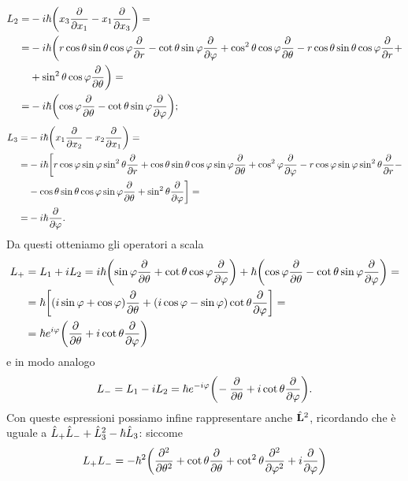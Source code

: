 \begin{equation}
	\begin{split}
		L_2=&-i\hbar\bigg(x_3\frac{\partial {}}{\partial {x_1}}-x_1\frac{\partial {}}{\partial {x_3}}\bigg)=\\
		=&-i\hbar\bigg(r\cos\theta\sin\theta\cos\varphi\frac{\partial {}}{\partial {r}}-\cot\theta\sin\varphi\frac{\partial {}}{\partial {\varphi}}+\cos^2\theta\cos\varphi\frac{\partial {}}{\partial {\theta}}-r\cos\theta\sin\theta\cos\varphi\frac{\partial {}}{\partial {r}}+\\
			&+\sin^2\theta\cos\varphi\frac{\partial {}}{\partial {\theta}}\bigg)=\\
		=&-i\hbar\bigg(\!\cos\varphi\frac{\partial {}}{\partial {\theta}}-\cot\theta\sin\varphi\frac{\partial {}}{\partial {\varphi}}\bigg);
	\end{split}
	\label{eq:L_2-schroedinger}
\end{equation}
\begin{equation}
	\begin{split}
		L_3=&-i\hbar\bigg(x_1\frac{\partial {}}{\partial {x_2}}-x_2\frac{\partial {}}{\partial {x_1}}\bigg)=\\
		=&-i\hbar\bigg[r\cos\varphi\sin\varphi\sin^2\theta\frac{\partial {}}{\partial {r}}+\cos\theta\sin\theta\cos\varphi\sin\varphi\frac{\partial {}}{\partial {\theta}}+\cos^2\varphi\frac{\partial {}}{\partial {\varphi}}-r\cos\varphi\sin\varphi\sin^2\theta\frac{\partial {}}{\partial {r}}-\\
			&-\cos\theta\sin\theta\cos\varphi\sin\varphi\frac{\partial {}}{\partial {\theta}}+\sin^2\theta\frac{\partial {}}{\partial {\varphi}}\bigg]=\\
		=&-i\hbar\frac{\partial {}}{\partial {\varphi}}.
	\end{split}
	\label{eq:L_3-schroedinger}
\end{equation}
Da questi otteniamo gli operatori a scala
\begin{equation}
	\begin{split}
		L_+&=L_1+iL_2=i\hbar\bigg(\!\sin\varphi\frac{\partial {}}{\partial {\theta}}+\cot\theta\cos\varphi\frac{\partial {}}{\partial {\varphi}}\bigg)+\hbar\bigg(\!\cos\varphi\frac{\partial {}}{\partial {\theta}}-\cot\theta\sin\varphi\frac{\partial {}}{\partial {\varphi}}\bigg)=\\
		&=\hbar\bigg[(i\sin\varphi+\cos\varphi)\frac{\partial {}}{\partial {\theta}}+(i\cos\varphi-\sin\varphi)\cot\theta\frac{\partial {}}{\partial {\varphi}}\bigg]=\\
		&=\hbar e^{i\varphi}\bigg(\frac{\partial {}}{\partial {\theta}}+i\cot\theta\frac{\partial {}}{\partial {\varphi}}\bigg)
	\end{split}
	\label{eq:L_+-schroedinger}
\end{equation}
e in modo analogo
\begin{equation}
	L_-=L_1-iL_2=\hbar e^{-i\varphi}\bigg(\!-\frac{\partial {}}{\partial {\theta}}+i\cot\theta\frac{\partial {}}{\partial {\varphi}}\bigg).
	\label{eq:L_--schroedinger}
\end{equation}
Con queste espressioni possiamo infine rappresentare anche $\hat{\mathbf{L}}^2$, ricordando che è uguale a $\hat{L}_+\hat{L}_-+\hat{L}_3^2-\hbar\hat{L}_3$: siccome
\begin{equation}
	L_+L_-=-\hbar^2\bigg(\frac{\partial^2 {}}{\partial {\theta}^2}+\cot\theta\frac{\partial {}}{\partial {\theta}}+\cot^2\theta\frac{\partial^2 {}}{\partial {\varphi}^2}+i\frac{\partial {}}{\partial {\varphi}}\bigg)
\end{equation}
